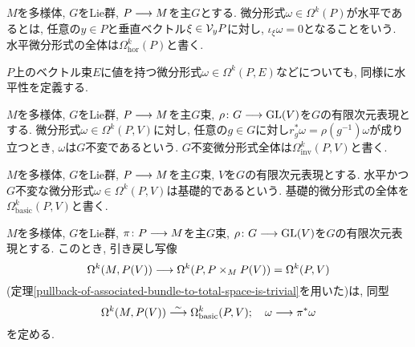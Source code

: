 \begin{dfn}
$M$を多様体, $G$をLie群, $P \longrightarrow M$を主$G$とする.
微分形式$\omega \in \Omega^k(P)$が水平であるとは,
任意の$y \in P$と垂直ベクトル$\xi \in \mathcal{V}_yP$に対し,
$\iota_\xi\omega = 0$となることをいう.
水平微分形式の全体は$\Omega_{\mathrm{hor}}^k(P)$と書く.
\end{dfn}

\begin{rem}
$P$上のベクトル束$E$に値を持つ微分形式$\omega \in \Omega^k(P, E)$などについても, 同様に水平性を定義する.
\end{rem}

\begin{dfn}
\label{definition-representation-valued-form-on-principal-bundle-is-invariant}
$M$を多様体, $G$をLie群, $P \longrightarrow M$を主$G$束,
$\rho \colon G \longrightarrow \operatorname{GL}(V)$を$G$の有限次元表現とする.
微分形式$\omega \in \Omega^k(P, V)$に対し,
任意の$g \in G$に対し$r_g^* \omega = \rho(g^{-1})\omega$が成り立つとき,
$\omega$は$G$不変であるという.
$G$不変微分形式全体は$\Omega^k_\mathrm{inv}(P, V)$と書く.
\end{dfn}

\begin{dfn}
$M$を多様体, $G$をLie群, $P \longrightarrow M$を主$G$束,
$V$を$G$の有限次元表現とする.
水平かつ$G$不変な微分形式$\omega \in \Omega^k(P, V)$は基礎的であるという.
基礎的微分形式の全体を$\Omega_{\mathrm{basic}}^k(P, V)$と書く.
\end{dfn}

\begin{thm}
\label{basic-form-and-associated-bundle-valued-form}
$M$を多様体, $G$をLie群, $\pi \colon P \longrightarrow M$を主$G$束,
$\rho \colon G \longrightarrow \operatorname{GL}(V)$を$G$の有限次元表現とする.
このとき, 引き戻し写像
\begin{equation}
\Omega^k(M, P(V)) \longrightarrow \Omega^k(P, P \times_M P(V)) = \Omega^k(P, V)
\end{equation}
(定理\ref{pullback-of-associated-bundle-to-total-space-is-trivial}を用いた)は, 同型
\begin{equation}
\Omega^k(M, P(V)) \stackrel{\sim}{\longrightarrow} \Omega^k_{\mathrm{basic}}(P, V); \quad \omega \longrightarrow \pi^* \omega
\end{equation}
を定める.
\end{thm}

